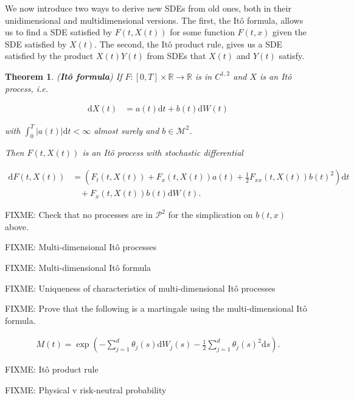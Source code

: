 \documentclass[a4paper]{article}
\newtheorem{theorem}[definition]{Theorem}
\begin{document}
We now introduce two ways to derive new SDEs from old ones, both in their unidimensional and multidimensional versions. The first, the It\^o formula, allows us to find a SDE satisfied by $F(t,X(t))$ for some function $F(t,x)$ given the SDE satisfied by $X(t)$. The second, the It\^o product rule, gives us a SDE satisfied by the product $X(t)Y(t)$ from SDEs that $X(t)$ and $Y(t)$ satisfy.

\begin{theorem}
  (\textbf{It\^o formula}) If $F : [0,T] \times \mathbb{R} \to \mathbb{R}$ is in $C^{1,2}$ and $X$ is an It\^o process, i.e.

  \begin{align*}
    \mathrm{d}X(t) &= a(t) \mathrm{d}t + b(t) \mathrm{d}W(t)
  \end{align*}

  with $\int_0^T |a(t)| \mathrm{d}t < \infty$ almost surely and $b \in \mathcal{M}^2$.

  Then $F(t,X(t))$ is an It\^o process with stochastic differential

  \begin{align*}
    \mathrm{d}F(t,X(t)) &= \left(F_t(t,X(t)) + F_x(t,X(t)) a(t) + \frac{1}{2} F_{xx}(t,X(t)) b(t)^2 \right) \mathrm{d}t\\
    &\ \ \ \ + F_x(t,X(t)) b(t) \mathrm{d}W(t).
  \end{align*}
\end{theorem}

FIXME: Check that no processes are in $\mathcal{P}^2$ for the simplication on $b(t,x)$ above.


FIXME: Multi-dimensional It\^o processes

FIXME: Multi-dimensional It\^o formula

FIXME: Uniqueness of characteristics of multi-dimensional It\^o processes

FIXME: Prove that the following is a martingale using the multi-dimensional It\^o formula.

\begin{align}\label{eq:exp-sums-martingale}
  M(t) = \exp \left( - \sum_{j=1}^{d} \theta_j(s) \mathrm{d}W_j(s) - \frac{1}{2} \sum_{j=1}^{d} \theta_j(s)^2 \mathrm{d}s \right).
\end{align}

FIXME: It\^o product rule

FIXME: Physical v risk-neutral probability
\end{document}
